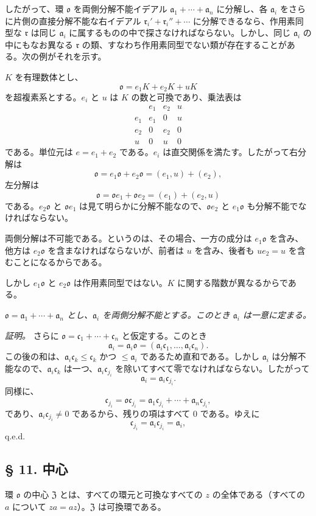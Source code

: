 \documentclass[11pt]{article}
\providecommand{\mo}{\mathfrak{o}}
\providecommand{\ma}{\mathfrak{a}}
\providecommand{\mc}{\mathfrak{c}}
\providecommand{\mr}{\mathfrak{r}}
\providecommand{\mZ}{\mathfrak{Z}}
\begin{document}
したがって、環 $\mo$ を両側分解不能イデアル $\ma_1+\cdots+\ma_n$ に分解し、各 $\ma_i$ をさらに片側の直接分解不能な右イデアル $\mr_i'+\mr_i''+\cdots$ に分解できるなら、作用素同型な $\mr$ は同じ $\ma_i$ に属するものの中で探さなければならない。しかし、同じ $\ma_i$ の中にもなお異なる $\mr$ の類、すなわち作用素同型でない類が存在することがある。次の例がそれを示す。

$K$ を有理数体とし、
\[
        \mo=e_1K+e_2K+uK
\]
を超複素系とする。$e_i$ と $u$ は $K$ の数と可換であり、乗法表は
\[
\begin{array}{c|ccc}
     & e_1&e_2&u\\ \hline
 e_1 & e_1&0&u\\
 e_2 & 0&e_2&0\\
 u   & 0&u&0
\end{array}
\]
である。単位元は $e=e_1+e_2$ である。$e_i$ は直交関係を満たす。したがって右分解は
\[
        \mo=e_1\mo+e_2\mo=(e_1,u)+(e_2),
\]
左分解は
\[
        \mo=\mo e_1+\mo e_2=(e_1)+(e_2,u)
\]
である。$e_2\mo$ と $\mo e_1$ は見て明らかに分解不能なので、$\mo e_2$ と $e_1\mo$ も分解不能でなければならない。

両側分解は不可能である。というのは、その場合、一方の成分は $e_1\mo$ を含み、他方は $e_2\mo$ を含まなければならないが、前者は $u$ を含み、後者も $ue_2=u$ を含むことになるからである。

しかし $e_1\mo$ と $e_2\mo$ は作用素同型ではない。$K$ に関する階数が異なるからである。

\emph{$\mo=\ma_1+\cdots+\ma_n$ とし、$\ma_i$ を両側分解不能とする。このとき $\ma_i$ は一意に定まる。}

\emph{証明。} さらに $\mo=\mc_1+\cdots+\mc_n$ と仮定する。このとき
\[
        \ma_i=\ma_i\mo=(\ma_i\mc_1,\ldots,\ma_i\mc_n).
\]
この後の和は、$\ma_i\mc_k\leq\mc_k$ かつ $\leq\ma_i$ であるため直和である。しかし $\ma_i$ は分解不能なので、$\ma_i\mc_k$ は一つ、$\ma_i\mc_{j_i}$ を除いてすべて零でなければならない。したがって
\[
        \ma_i=\ma_i\mc_{j_i}.
\]
同様に、
\[
        \mc_{j_i}=\mo\mc_{j_i}=\ma_1\mc_{j_i}+\cdots+\ma_n\mc_{j_i},
\]
であり、$\ma_i\mc_{j_i}\ne0$ であるから、残りの項はすべて $0$ である。ゆえに
\[
        \mc_{j_i}=\ma_i\mc_{j_i}=\ma_i,
\]
q.e.d.

\subsection*{§ 11. 中心}

環 $\mo$ の中心 $\mZ$ とは、すべての環元と可換なすべての $z$ の全体である（すべての $a$ について $za=az$）。$\mZ$ は可換環である。
\end{document}
